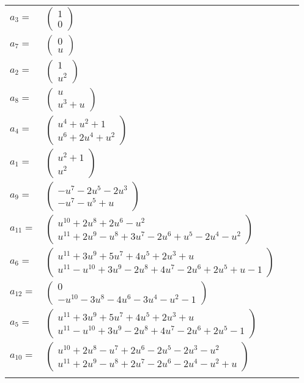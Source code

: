 \documentclass[1p]{elsarticle_modified}
\theoremstyle{definition}
\begin{document}
\begin{tabular}{m{7pt} m{180pt} m{7pt} m{180pt} }
\flushright $a_{3}=$&$\begin{pmatrix}1\\0\end{pmatrix}$ \\
\flushright $a_{7}=$&$\begin{pmatrix}0\\u\end{pmatrix}$ \\
\flushright $a_{2}=$&$\begin{pmatrix}1\\u^2\end{pmatrix}$ \\
\flushright $a_{8}=$&$\begin{pmatrix}u\\u^3+u\end{pmatrix}$ \\
\flushright $a_{4}=$&$\begin{pmatrix}u^4+u^2+1\\u^6+2 u^4+u^2\end{pmatrix}$ \\
\flushright $a_{1}=$&$\begin{pmatrix}u^2+1\\u^2\end{pmatrix}$ \\
\flushright $a_{9}=$&$\begin{pmatrix}- u^7-2 u^5-2 u^3\\- u^7- u^5+u\end{pmatrix}$ \\
\flushright $a_{11}=$&$\begin{pmatrix}u^{10}+2 u^8+2 u^6- u^2\\u^{11}+2 u^9- u^8+3 u^7-2 u^6+u^5-2 u^4- u^2\end{pmatrix}$ \\
\flushright $a_{6}=$&$\begin{pmatrix}u^{11}+3 u^9+5 u^7+4 u^5+2 u^3+u\\u^{11}- u^{10}+3 u^9-2 u^8+4 u^7-2 u^6+2 u^5+u-1\end{pmatrix}$ \\
\flushright $a_{12}=$&$\begin{pmatrix}0\\- u^{10}-3 u^8-4 u^6-3 u^4- u^2-1\end{pmatrix}$ \\
\flushright $a_{5}=$&$\begin{pmatrix}u^{11}+3 u^9+5 u^7+4 u^5+2 u^3+u\\u^{11}- u^{10}+3 u^9-2 u^8+4 u^7-2 u^6+2 u^5-1\end{pmatrix}$ \\
\flushright $a_{10}=$&$\begin{pmatrix}u^{10}+2 u^8- u^7+2 u^6-2 u^5-2 u^3- u^2\\u^{11}+2 u^9- u^8+2 u^7-2 u^6-2 u^4- u^2+u\end{pmatrix}$\\&\end{tabular}
\end{document}
